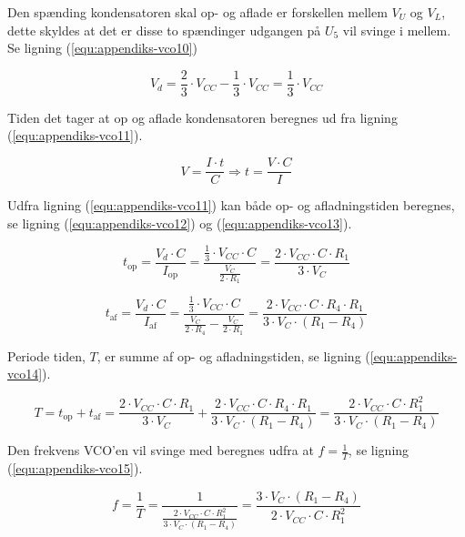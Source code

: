 Den spænding kondensatoren skal op- og aflade er forskellen mellem $V_U$ og $V_L$, dette skyldes at det er disse to spændinger udgangen på $U_5$ vil svinge i mellem. Se ligning (\ref{equ:appendiks-vco10})

\begin{equation}
\label{equ:appendiks-vco10}
V_d = \frac{2}{3} \cdot V_{CC} - \frac{1}{3} \cdot V_{CC} = \frac{1}{3} \cdot V_{CC}
\end{equation}

Tiden det tager at op og aflade kondensatoren beregnes ud fra ligning (\ref{equ:appendiks-vco11}).

\begin{equation}
\label{equ:appendiks-vco11}
V = \frac{I \cdot t}{C} \Rightarrow t = \frac{V \cdot C}{I}
\end{equation}

Udfra ligning (\ref{equ:appendiks-vco11}) kan både op- og afladningstiden beregnes, se ligning (\ref{equ:appendiks-vco12}) og (\ref{equ:appendiks-vco13}).

\begin{equation}
\label{equ:appendiks-vco12}
t_{\mathrm{op}} = \frac{V_d \cdot C}{I_{\mathrm{op}}} = \frac{\frac{1}{3} \cdot V_{CC} \cdot C}{\frac{V_C}{2 \cdot R_1}} = \frac{2 \cdot V_{CC} \cdot C \cdot R_1}{3 \cdot V_C}
\end{equation}

\begin{equation}
\label{equ:appendiks-vco13}
t_{\mathrm{af}} = \frac{V_d \cdot C}{I_{\mathrm{af}}} = \frac{\frac{1}{3} \cdot V_{CC} \cdot C}{\frac{V_C}{2 \cdot R_4} - \frac{V_C}{2 \cdot R_1}} = \frac{2 \cdot V_{CC} \cdot C \cdot R_4 \cdot R_1}{3 \cdot V_C \cdot (R_1 - R_4)}
\end{equation}

Periode tiden, $T$, er summe af op- og afladningstiden, se ligning (\ref{equ:appendiks-vco14}).

\begin{equation}
\label{equ:appendiks-vco14}
T = t_{\mathrm{op}} + t_{\mathrm{af}} = \frac{2 \cdot V_{CC} \cdot C \cdot R_1}{3 \cdot V_C} + \frac{2 \cdot V_{CC} \cdot C \cdot R_4 \cdot R_1}{3 \cdot V_C \cdot (R_1 - R_4)} = \frac{2 \cdot V_{CC} \cdot C \cdot R_1^2}{3 \cdot V_C \cdot (R_1 - R_4)}
\end{equation}

Den frekvens VCO'en vil svinge med beregnes udfra at $f = \frac{1}{T}$, se ligning (\ref{equ:appendiks-vco15}).

\begin{equation}
\label{equ:appendiks-vco15}
f = \frac{1}{T} = \frac{1}{\frac{2 \cdot V_{CC} \cdot C \cdot R_1^2}{3 \cdot V_C \cdot (R_1 - R_4)}} = \frac{3 \cdot V_C \cdot (R_1 - R_4)}{2 \cdot V_{CC} \cdot C \cdot R_1^2}
\end{equation}